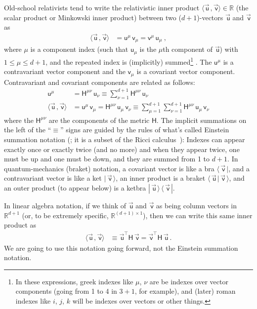 \documentclass{article}
\newcommand{\metric}{\mathsf{H}}
\newcommand\upvec[1]{\!\vec{\,\mathrm{#1}}}
\newcommand{\Lvec}[1]{\upvec{\mathsf{#1}}} %
\newcommand{\Lblank}[1]{\mathsf{#1}} %
\newcommand{\inner}[2]{\langle{#1}\,,{#2}\rangle}
\newcommand{\bra}[1]{\langle\,{#1}\,|}
\newcommand{\ket}[1]{|\,{#1}\,\rangle}
\newcommand{\braket}[2]{\langle\,{#1}\,|\,{#2}\,\rangle}
\newcommand{\ketbra}[2]{|\,{#1}\,\rangle\,\langle\,{#2}\,|}
\newcommand{\plus}{\!+\!} %
\begin{document}
Old-school relativists tend to write the relativistic inner product $\inner{\Lvec{u}}{\Lvec{v}}\in\mathbb{R}$ (the scalar product or Minkowski inner product) between two ($d\plus1$)-vectors $\Lvec{u}$ and $\Lvec{v}$ as
\begin{align}
    \inner{\Lvec{u}}{\Lvec{v}} &= \Lblank{u}^\mu\,\Lblank{v}_\mu = \Lblank{v}^\mu\,\Lblank{u}_\mu ~,
\end{align}
where $\mu$ is a component index (such that $\Lblank{u}_\mu$ is the $\mu$th component of $\Lvec{u}$) with $1\leq\mu\leq d+1$, and the repeated index is (implicitly) summed\footnote{%
In these expressions, greek indexes like $\mu$, $\nu$ are be indexes over vector components (going from 1 to 4 in $3\plus1$, for example), and (later) roman indexes like $i$, $j$, $k$ will be indexes over vectors or other things.} .
The $\Lblank{u}^\mu$ is a contravariant vector component and the $\Lblank{v}_\mu$ is a covariant vector component.
Contravariant and covariant components are related as follows:
\begin{align}
    \Lblank{u}^\mu &= \metric^{\mu\nu}\,\Lblank{u}_\nu \equiv \sum_{\nu=1}^{d+1} \metric^{\mu\nu}\,\Lblank{u}_\nu
    \\
    \inner{\Lvec{u}}{\Lvec{v}} &= \Lblank{u}^\mu\,\Lblank{v}_\mu = \metric^{\mu\nu}\,\Lblank{u}_\mu\,\Lblank{v}_\nu \equiv \sum_{\mu=1}^{d+1}\sum_{\nu=1}^{d+1} \metric^{\mu\nu}\,\Lblank{u}_\mu\,\Lblank{v}_\nu
\end{align}
where the $\metric^{\mu\nu}$ are the components of the metric $\metric$.
The implicit summations on the left of the ``$\equiv$'' signs are guided by the rules of what's called Einstein summation notation (\cite{summation}; it is a subset of the Ricci calculus~\cite{ricci}): Indexes can appear exactly once or exactly twice (and no more) and when they appear twice, one must be up and one must be down, and they are summed from 1 to $d+1$.
In quantum-mechanics (braket) notation, a covariant vector is like a bra $\bra{\Lvec{v}}$, and a contravariant vector is like a ket $\ket{\Lvec{v}}$,
an inner product is a braket $\braket{\Lvec{u}}{\Lvec{v}}$, and an outer product (to appear below) is a ketbra $\ketbra{\Lvec{u}}{\Lvec{v}}$.

In linear algebra notation, if we think of $\Lvec{u}$ and $\Lvec{v}$ as being column vectors in $\mathbb{R}^{d+1}$ (or, to be extremely specific, $\mathbb{R}^{(d+1)\times 1}$), then we can write this same inner product as
\begin{align}\label{eq:inner}
    \inner{\Lvec{u}}{\Lvec{v}} &\equiv \Lvec{u}^\top\metric\,\Lvec{v} = \Lvec{v}^\top\metric\,\Lvec{u} ~.
\end{align}
We are going to use this notation going forward, not the Einstein summation notation.
\end{document}
